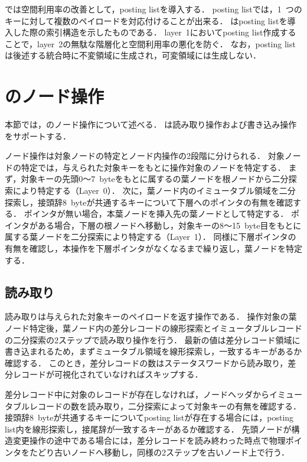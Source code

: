 \Bcforest{}では空間利用率の改善として，posting listを導入する．
posting listでは，1~つのキーに対して複数のペイロードを対応付けることが出来る．
\Fig{\ref{fig:posting_list}}はposting listを導入した際の索引構造を示したものである．
layer~1においてposting list作成することで，layer~2の無駄な階層化と空間利用率の悪化を防ぐ．
なお，posting listは後述する統合時に不変領域に生成され，可変領域には生成しない．

\section{\Bcforest{}のノード操作}
\label{sec:node_operation}
本節では，\Bcforest{}のノード操作について述べる．
\Bcforest{}は読み取り操作および書き込み操作をサポートする．

ノード操作は対象ノードの特定とノード内操作の2段階に分けられる．
対象ノードの特定では，与えられた対象キーをもとに操作対象のノードを特定する．
まず，対象キーの先頭0～7~byteをもとに属するの葉ノードを根ノードから二分探索により特定する（Layer~0）．
次に，葉ノード内のイミュータブル領域を二分探索し，接頭辞8~byteが共通するキーについて下層へのポインタの有無を確認する．
ポインタが無い場合，本葉ノードを挿入先の葉ノードとして特定する．
ポインタがある場合，下層の根ノードへ移動し，対象キーの8～15~byte目をもとに属する葉ノードを二分探索により特定する（Layer~1）．
同様に下層ポインタの有無を確認し，本操作を下層ポインタがなくなるまで繰り返し，葉ノードを特定する．

\subsection{読み取り}
読み取りは与えられた対象キーのペイロードを返す操作である．
操作対象の葉ノード特定後，葉ノード内の差分レコードの線形探索とイミュータブルレコードの二分探索の2ステップで読み取り操作を行う．
最新の値は差分レコード領域に書き込まれるため，まずミュータブル領域を線形探索し，一致するキーがあるか確認する．
このとき，差分レコードの数はステータスワードから読み取り，差分レコードが可視化されていなければスキップする．

差分レコード中に対象のレコードが存在しなければ，ノードヘッダからイミュータブルレコードの数を読み取り，二分探索によって対象キーの有無を確認する．
接頭辞8~byteが共通するキーについてposting listが存在する場合には，posting list内を線形探索し，接尾辞が一致するキーがあるか確認する．
先頭ノードが構造変更操作の途中である場合には，差分レコードを読み終わった時点で物理ポインタをたどり古いノードへ移動し，同様の2ステップを古いノード上で行う．

